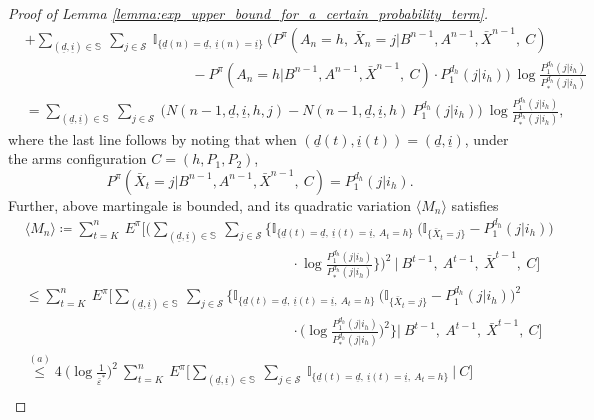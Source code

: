 \begin{proof}[Proof of Lemma \ref{lemma:exp_upper_bound_for_a_certain_probability_term}]
\begin{align}
	&+\sum\limits_{(\underline{d}, \underline{i})\in \mathbb{S}}~\sum\limits_{j\in \mathcal{S}}~\mathbb{I}_{\{\underline{d}(n)=\underline{d},~\underline{i}(n)=\underline{i}\}}~\bigg(P^\pi(A_n=h,~\bar{X}_n=j|B^{n-1}, A^{n-1}, \bar{X}^{n-1}, ~C)\nonumber\\
	&\hspace{5cm}-P^\pi(A_n=h|B^{n-1}, A^{n-1}, \bar{X}^{n-1}, ~C)\cdot P_1^{d_h}(j|i_h)\bigg)~\log \frac{P_1^{d_h}(j|i_h)}{P_*^{d_h}(j|i_h)}\nonumber\\
		&=\sum\limits_{(\underline{d}, \underline{i})\in \mathbb{S}}~\sum\limits_{j\in \mathcal{S}}~\bigg(N(n-1, \underline{d}, \underline{i}, h, j)-N(n-1, \underline{d}, \underline{i}, h)~P_1^{d_h}(j|i_h)\bigg)~\log \frac{P_1^{d_h}(j|i_h)}{P_*^{d_h}(j|i_h)},
\end{align}
where the last line follows by noting that when $(\underline{d}(t), \underline{i}(t))=(\underline{d}, \underline{i})$, under the arms configuration $C=(h, P_1, P_2)$, $$  P^\pi(\bar{X}_t=j|B^{n-1}, A^{n-1}, \bar{X}^{n-1}, ~C)=P_1^{d_h}(j|i_h).$$ Further, above martingale is bounded, and its quadratic variation $\langle M_n \rangle$ satisfies
\begin{align}
	& \langle M_n\rangle \coloneqq \sum\limits_{t=K}^n ~E^\pi\bigg[\bigg(\sum\limits_{(\underline{d}, \underline{i})\in \mathbb{S}}~\sum\limits_{j\in \mathcal{S}}\bigg\lbrace\mathbb{I}_{\{\underline{d}(t)=\underline{d},~\underline{i}(t)=\underline{i},~A_t=h\}}~\bigg(\mathbb{I}_{\{\bar{X}_t=j\}}-P_1^{d_h}(j|i_h)\bigg)\nonumber\\
	&\hspace{8cm}\cdot \log \frac{P_1^{d_h}(j|i_h)}{P_*^{d_h}(j|i_h)}\bigg\rbrace\bigg)^2~\bigg|~B^{t-1}, ~A^{t-1}, ~\bar{X}^{t-1},~C\bigg]\nonumber\\
	&\leq \sum\limits_{t=K}^n ~E^\pi\bigg[\sum\limits_{(\underline{d}, \underline{i})\in \mathbb{S}}~\sum\limits_{j\in \mathcal{S}}\bigg\lbrace\mathbb{I}_{\{\underline{d}(t)=\underline{d},~\underline{i}(t)=\underline{i},~A_t=h\}}~\bigg(\mathbb{I}_{\{\bar{X}_t=j\}}-P_1^{d_h}(j|i_h)\bigg)^2\nonumber\\
	&\hspace{8cm}\cdot\bigg(\log \frac{P_1^{d_h}(j|i_h)}{P_*^{d_h}(j|i_h)}\bigg)^2\bigg\rbrace\bigg|~B^{t-1}, ~A^{t-1}, ~\bar{X}^{t-1},~C\bigg]\nonumber\\
	&\stackrel{(a)}{\leq} 4~\bigg(\log \frac{1}{\bar{\varepsilon}^*}\bigg)^2~\sum\limits_{t=K}^n ~E^\pi\bigg[\sum\limits_{(\underline{d}, \underline{i})\in \mathbb{S}}~\sum\limits_{j\in \mathcal{S}}~\mathbb{I}_{\{\underline{d}(t)=\underline{d},~\underline{i}(t)=\underline{i},~A_t=h\}}~\bigg|~C\bigg]\nonumber\\

\end{align}
\end{proof}

